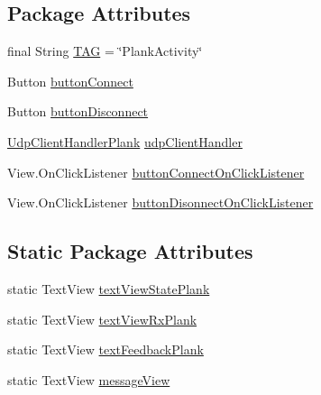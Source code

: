 \subsection*{Package Attributes}
\begin{DoxyCompactItemize}
\item 
final String \mbox{\hyperlink{classcom_1_1example_1_1trainawearapplication_1_1_plank_a2ed8334d29e8faa74b7ab74192abf971}{T\+AG}} = \char`\"{}Plank\+Activity\char`\"{}
\item 
Button \mbox{\hyperlink{classcom_1_1example_1_1trainawearapplication_1_1_plank_acb341a1f005dbca332d8e34b5699e156}{button\+Connect}}
\item 
Button \mbox{\hyperlink{classcom_1_1example_1_1trainawearapplication_1_1_plank_a7b5bd72e6e829e6b39833e7d51e941aa}{button\+Disconnect}}
\item 
\mbox{\hyperlink{classcom_1_1example_1_1trainawearapplication_1_1_udp_client_handler_plank}{Udp\+Client\+Handler\+Plank}} \mbox{\hyperlink{classcom_1_1example_1_1trainawearapplication_1_1_plank_a993af1f74afdb25d3d31aeef952d173d}{udp\+Client\+Handler}}
\item 
View.\+On\+Click\+Listener \mbox{\hyperlink{classcom_1_1example_1_1trainawearapplication_1_1_plank_af4947503f5175d2cedc59bdc52fa587e}{button\+Connect\+On\+Click\+Listener}}
\item 
View.\+On\+Click\+Listener \mbox{\hyperlink{classcom_1_1example_1_1trainawearapplication_1_1_plank_a477a999a99016b2f4a1b087853ab1609}{button\+Disonnect\+On\+Click\+Listener}}
\end{DoxyCompactItemize}
\subsection*{Static Package Attributes}
\begin{DoxyCompactItemize}
\item 
static Text\+View \mbox{\hyperlink{classcom_1_1example_1_1trainawearapplication_1_1_plank_a071a37e45c3235d62da61f00806bf26c}{text\+View\+State\+Plank}}
\item 
static Text\+View \mbox{\hyperlink{classcom_1_1example_1_1trainawearapplication_1_1_plank_a73da97a021a815589ccc6bec8a56241b}{text\+View\+Rx\+Plank}}
\item 
static Text\+View \mbox{\hyperlink{classcom_1_1example_1_1trainawearapplication_1_1_plank_a6d563e78cebce2b29884467b028dfdaf}{text\+Feedback\+Plank}}
\item 
static Text\+View \mbox{\hyperlink{classcom_1_1example_1_1trainawearapplication_1_1_plank_a0170d0db61f91fcda18f59d7c6dc626a}{message\+View}}
\end{DoxyCompactItemize}
